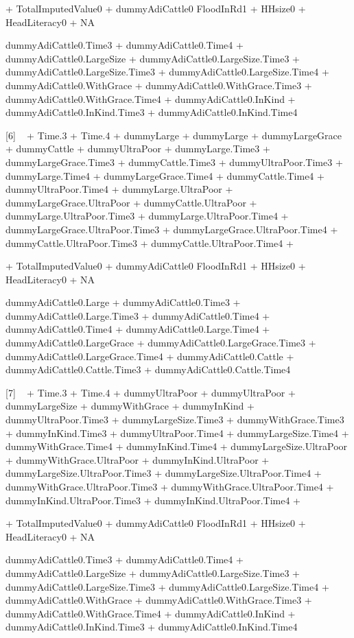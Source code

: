 \begin{Schunk}
\begin{Soutput}
 + TotalImputedValue0
 + dummyAdiCattle0
FloodInRd1 + HHsize0 + HeadLiteracy0 + NA

dummyAdiCattle0.Time3 + dummyAdiCattle0.Time4 + dummyAdiCattle0.LargeSize + dummyAdiCattle0.LargeSize.Time3
 + dummyAdiCattle0.LargeSize.Time3 + dummyAdiCattle0.LargeSize.Time4 + dummyAdiCattle0.WithGrace
 + dummyAdiCattle0.WithGrace.Time3 + dummyAdiCattle0.WithGrace.Time4 + dummyAdiCattle0.InKind
 + dummyAdiCattle0.InKind.Time3 + dummyAdiCattle0.InKind.Time4

 

[6]
 ~  + Time.3 + Time.4 + dummyLarge
 + dummyLarge + dummyLargeGrace + dummyCattle
 + dummyUltraPoor + dummyLarge.Time3 + dummyLargeGrace.Time3
 + dummyCattle.Time3 + dummyUltraPoor.Time3 + dummyLarge.Time4
 + dummyLargeGrace.Time4 + dummyCattle.Time4 + dummyUltraPoor.Time4
 + dummyLarge.UltraPoor + dummyLargeGrace.UltraPoor + dummyCattle.UltraPoor
 + dummyLarge.UltraPoor.Time3 + dummyLarge.UltraPoor.Time4 + dummyLargeGrace.UltraPoor.Time3
 + dummyLargeGrace.UltraPoor.Time4 + dummyCattle.UltraPoor.Time3 + dummyCattle.UltraPoor.Time4
 + 

 + TotalImputedValue0
 + dummyAdiCattle0
FloodInRd1 + HHsize0 + HeadLiteracy0 + NA

dummyAdiCattle0.Large + dummyAdiCattle0.Time3 + dummyAdiCattle0.Large.Time3 + dummyAdiCattle0.Time4
 + dummyAdiCattle0.Time4 + dummyAdiCattle0.Large.Time4 + dummyAdiCattle0.LargeGrace
 + dummyAdiCattle0.LargeGrace.Time3 + dummyAdiCattle0.LargeGrace.Time4 + dummyAdiCattle0.Cattle
 + dummyAdiCattle0.Cattle.Time3 + dummyAdiCattle0.Cattle.Time4

 

[7]
 ~  + Time.3 + Time.4 + dummyUltraPoor
 + dummyUltraPoor + dummyLargeSize + dummyWithGrace
 + dummyInKind + dummyUltraPoor.Time3 + dummyLargeSize.Time3
 + dummyWithGrace.Time3 + dummyInKind.Time3 + dummyUltraPoor.Time4
 + dummyLargeSize.Time4 + dummyWithGrace.Time4 + dummyInKind.Time4
 + dummyLargeSize.UltraPoor + dummyWithGrace.UltraPoor + dummyInKind.UltraPoor
 + dummyLargeSize.UltraPoor.Time3 + dummyLargeSize.UltraPoor.Time4 + dummyWithGrace.UltraPoor.Time3
 + dummyWithGrace.UltraPoor.Time4 + dummyInKind.UltraPoor.Time3 + dummyInKind.UltraPoor.Time4
 + 

 + TotalImputedValue0
 + dummyAdiCattle0
FloodInRd1 + HHsize0 + HeadLiteracy0 + NA

dummyAdiCattle0.Time3 + dummyAdiCattle0.Time4 + dummyAdiCattle0.LargeSize + dummyAdiCattle0.LargeSize.Time3
 + dummyAdiCattle0.LargeSize.Time3 + dummyAdiCattle0.LargeSize.Time4 + dummyAdiCattle0.WithGrace
 + dummyAdiCattle0.WithGrace.Time3 + dummyAdiCattle0.WithGrace.Time4 + dummyAdiCattle0.InKind
 + dummyAdiCattle0.InKind.Time3 + dummyAdiCattle0.InKind.Time4

 
\end{Soutput}
\end{Schunk}





